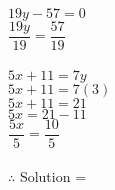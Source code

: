 \begin{enumerate}[label = \arabic*. ]
\begin{multicols}{2}

$ 19y -57=0$  \\
$ \dfrac{19y}{19}  =\dfrac{57}{19} $ \redcheck \\
\redcheck \\

$ 5x+11 = 7y$ \redcheck \\
$ 5x+11 = 7(3) $ \redcheck \\
$ 5x+11 = 21 $ \redcheck \\
$ 5x = 21-11 $ \redcheck \\
$ \dfrac{5x}{5}  = \dfrac{10}{5} $ \redcheck \\
\redcheck \\

$\therefore$ Solution =  \redcheck 

 
\end{multicols} 
\end{enumerate} 
